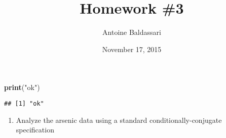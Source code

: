 \documentclass[]{article}
\title{Homework \#3}
\author{Antoine Baldassari}
\date{November 17, 2015}
\newenvironment{Shaded}{\begin{snugshade}}{\end{snugshade}}
\newcommand{\KeywordTok}[1]{\textcolor[rgb]{0.13,0.29,0.53}{\textbf{{#1}}}}
\newcommand{\StringTok}[1]{\textcolor[rgb]{0.31,0.60,0.02}{{#1}}}
\newcommand{\NormalTok}[1]{{#1}}
\begin{document}
\maketitle


\begin{Shaded}
\begin{Highlighting}[]
\KeywordTok{print}\NormalTok{(}\StringTok{"ok"}\NormalTok{)}
\end{Highlighting}
\end{Shaded}

\begin{verbatim}
## [1] "ok"
\end{verbatim}

\begin{enumerate}
        \item Analyze the arsenic data using a standard conditionally-conjugate specification\\
        

\end{enumerate}
\end{document}
